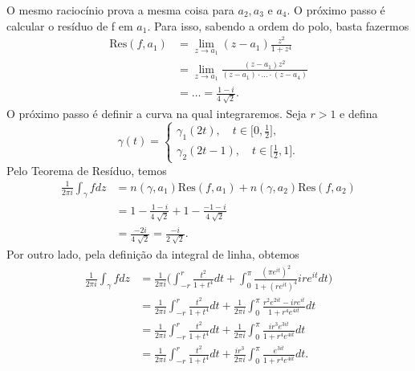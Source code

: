 \documentclass[complex.tex]{subfiles}
\begin{document}
\begin{exer*}
	O mesmo raciocínio prova a mesma coisa para \(a_{2}, a_3\) e \(a_{4}\). O próximo passo é calcular o resíduo de f em \(a_{1}.\) Para isso, sabendo a ordem
	do polo, basta fazermos
	\begin{align*}
		\mathrm{Res}(f , a_{1}) & = \lim_{z\to a_{1}}(z-a_{1})\frac{z^{2}}{1+z^{4}}                               \\
		                        & = \lim_{z\to a_{1}}\frac{(z-a_{1})z^{2}}{(z-a_{1})\cdot \dotsc \cdot (z-a_{4})} \\
		                        & = \dotsc = \frac{1-i}{4\sqrt[]{2}}.
	\end{align*}
	O próximo passo é definir a curva na qual integraremos. Seja \(r > 1\) e defina
	\[
		\gamma (t) = \left\{\begin{array}{ll}
			\gamma_{1}(2t),\quad t\in \biggl[0, \frac{1}{2}\biggr], \\
			\gamma_{2}(2t-1),\quad t\in \biggl[\frac{1}{2}, 1\biggr].
		\end{array}\right.
	\]
	Pelo Teorema de Resíduo, temos
	\begin{align*}
		\frac{1}{2\pi i}\int_{\gamma }^{}f dz & = n(\gamma , a_{1})\mathrm{Res}(f, a_{1}) + n(\gamma , a_{2})\mathrm{Res}(f, a_{2}) \\
		                                      & = 1 - \frac{1-i}{4\sqrt[]{2}} + 1 - \frac{-1-i}{4\sqrt[]{2}}                        \\
		                                      & = \frac{-2i}{4\sqrt[]{2}} = \frac{-i}{2\sqrt[]{2}}.
	\end{align*}
	Por outro lado, pela definição da integral de linha, obtemos
	\begin{align*}
		\frac{1}{2\pi i}\int_{\gamma }^{}f dz & = \frac{1}{2\pi i}\biggl(\int_{-r}^{r}\frac{t^{2}}{1+t^{4}}dt + \int_{0}^{\pi }\frac{(\pi e^{it})^{2}}{1 + (re^{it})^{4}}ire^{it}dt\biggr)   \\
		                                      & = \frac{1}{2\pi i}\int_{-r}^{r}\frac{t^{2}}{1+t^{4}}dt + \frac{1}{2\pi i}\int_{0}^{\pi }\frac{r^{2}e^{2it} - i r e^{it}}{1 + r^{4}e^{4it}}dt \\
		                                      & = \frac{1}{2\pi i}\int_{-r}^{r}\frac{t^{2}}{1+t^{4}}dt + \frac{1}{2\pi i}\int_{0}^{\pi }\frac{ir^{3}e^{3it}}{1 + r^{4}e^{4it}}dt             \\
		                                      & = \frac{1}{2\pi i}\int_{-r}^{r}\frac{t^{2}}{1+t^{4}}dt + \frac{ir^{3}}{2\pi i}\int_{0}^{\pi }\frac{e^{3it}}{1 + r^{4}e^{4it}}dt.
	\end{align*}

\end{exer*}
\end{document}

